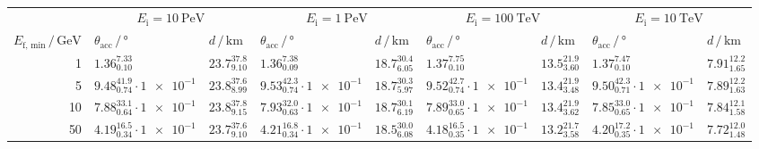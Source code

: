 \begin{table*}
    \centering
    \caption{}
    \label{tab:final_values}       %
    \begin{tabular}{r|ll|ll|ll|ll}
    \hline\noalign{\smallskip}
    & \multicolumn{2}{c|}{$E_{\mathrm{i}} = \SI{10}{\peta\electronvolt}$} & \multicolumn{2}{c|}{$E_{\mathrm{i}} = \SI{1}{\peta\electronvolt}$} 
    & \multicolumn{2}{c|}{$E_{\mathrm{i}} = \SI{100}{\tera\electronvolt}$} & \multicolumn{2}{c}{$E_{\mathrm{i}} = \SI{10}{\tera\electronvolt}$} \\
    $E_{\mathrm{f,\,min}}\,/\,\si{\giga\electronvolt}$ & $\theta_{\text{acc}}\,/\,\si{\degree}$ & $d\,/\,\si{\kilo\meter}$  
    & $\theta_{\text{acc}}\,/\,\si{\degree}$ & $d\,/\,\si{\kilo\meter}$ 
    & $\theta_{\text{acc}}\,/\,\si{\degree}$ & $d\,/\,\si{\kilo\meter}$
    & $\theta_{\text{acc}}\,/\,\si{\degree}$ & $d\,/\,\si{\kilo\meter}$\\
    \noalign{\smallskip}\hline\noalign{\smallskip}
    \rule{0pt}{2.6ex}\num{1}        & $1.36_{0.10}^{7.33}$ & $23.7_{9.10}^{37.8}$ & $1.36_{0.09}^{7.38}$ & $18.7_{6.05}^{30.4}$ & $1.37_{0.10}^{7.75}$ & $13.5_{3.60}^{21.9}$ & $1.37_{0.10}^{7.47}$ & $7.91_{1.65}^{12.2}$ \\
    \rule{0pt}{2.6ex}\num{5}        & $9.48_{0.74}^{41.9}\cdot \num{1e-1}$ & $23.8_{8.99}^{37.6}$ & $9.53_{0.74}^{42.3}\cdot \num{1e-1}$ & $18.7_{5.97}^{30.3}$ & $9.52_{0.74}^{42.7}\cdot \num{1e-1}$ & $13.4_{3.48}^{21.9}$ & $9.50_{0.71}^{42.3}\cdot \num{1e-1}$ & $7.89_{1.63}^{12.2}$ \\
    \rule{0pt}{2.6ex}\num{10}       & $7.88_{0.64}^{33.1}\cdot \num{1e-1}$ & $23.8_{9.15}^{37.8}$ & $7.93_{0.63}^{32.0}\cdot \num{1e-1}$ & $18.7_{6.19}^{30.1}$ & $7.89_{0.65}^{33.0}\cdot \num{1e-1}$ & $13.4_{3.62}^{21.9}$ & $7.85_{0.65}^{33.0}\cdot \num{1e-1}$ & $7.84_{1.58}^{12.1}$ \\
    \rule{0pt}{2.6ex}\num{50}       & $4.19_{0.34}^{16.5}\cdot \num{1e-1}$ & $23.7_{9.10}^{37.6}$ & $4.21_{0.34}^{16.8}\cdot \num{1e-1}$ & $18.5_{6.08}^{30.0}$ & $4.18_{0.35}^{16.5}\cdot \num{1e-1}$ & $13.2_{3.58}^{21.7}$ & $4.20_{0.35}^{17.2}\cdot \num{1e-1}$ & $7.72_{1.48}^{12.0}$ \\

\end{tabular}
\end{table*}
